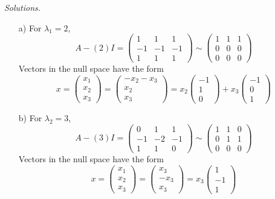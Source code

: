     \ifnum {} {\color{DarkBlue} \textit{Solutions.} 
    \begin{enumerate}
        \item[a)] For $\lambda_1 = 2$, 
        $$A - (2) I = \begin{pmatrix} 1&1&1\\-1&-1&-1\\1&1&1\end{pmatrix}\sim\begin{pmatrix} 1&1&1\\0&0&0\\0&0&0\end{pmatrix}$$ Vectors in the null space have the form $$x = \begin{pmatrix}x_1\\x_2\\x_3 \end{pmatrix} = \begin{pmatrix}-x_2-x_3\\x_2\\x_3 \end{pmatrix} = x_2\begin{pmatrix} -1\\1\\0\end{pmatrix} + x_3 \begin{pmatrix} -1\\0\\1\end{pmatrix}$$ 
        \item[b)] For $\lambda_2 = 3$, 
        $$A - (3) I = \begin{pmatrix} 0&1&1\\-1&-2&-1\\1&1&0\end{pmatrix}\sim\begin{pmatrix} 1&1&0\\0&1&1\\0&0&0\end{pmatrix}$$ Vectors in the null space have the form $$x = \begin{pmatrix}x_1\\x_2\\x_3 \end{pmatrix} = \begin{pmatrix}x_3\\-x_3\\x_3 \end{pmatrix} = x_3 \begin{pmatrix} 1\\-1\\1\end{pmatrix}$$ 

\end{enumerate}}
